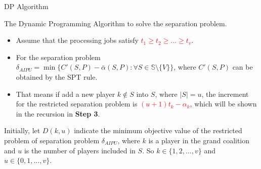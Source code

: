 \documentclass[14pt]{beamer}
\begin{document}
\begin{frame}{DP Algorithm}
	\vspace{-2mm}
	\begin{block}
		{The Dynamic Programming Algorithm to solve the separation problem.}
	\end{block}
	\small
	\begin{itemize}
		\item 	Assume that the processing jobs satisfy \textcolor{red}{$t_1 \geq t_2 \geq \ldots \geq t_v$}.
		\item  For the separation problem $\delta_{AIPU} = \min \big\{ C'(S,P) -\bar{\alpha}(S,P): \forall S \in \mathbb{S} \setminus \{V\}\big\}$, where $C'(S,P)$ can be obtained by the SPT rule.
		\item  That means if add a new player $k\notin S$ into $S$, where $|S| =u$, the increment for the restricted separation problem is \textcolor{red}{$(u+1)t_k-\alpha_k$}, which will be shown in the recursion in \textbf{Step 3}.
	\end{itemize}

	\begin{description}
	\justifying
	\footnotesize
	\item[Step 1.] Initially, let $D(k,u)$ indicate the minimum objective value of the restricted problem of separation problem $\delta_{AIPU}$, where $k$ is a player in the grand coalition and $u$ is the number of players included in $S$. So $ k \in \{1,2,\ldots,v\}$ and $u\in \{0,1,\ldots,v\}$.

\end{description}

\end{frame}
\end{document}
